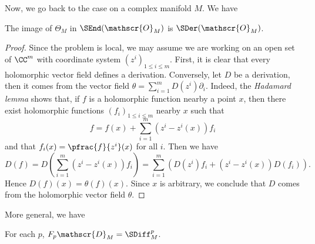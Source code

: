 Now, we go back to the case on a complex manifold $M$. We have
\begin{lem}\label{lem:Theta=Der}
The image of $\Theta_M$ in $\SEnd(\mathscr{O}_M)$ is $\SDer(\mathscr{O}_M)$.
\end{lem}
\begin{proof}
Since the problem is local, 
we may assume we are working on an open set of $\CC^m$ 
with coordinate system $(z^i)_{1\le i\le m}$. 
First, it is clear that every holomorphic vector field defines a derivation. 
Conversely, let $D$ be a derivation, then it comes from the vector field 
$\theta=\sum_{i=1}^mD(z^i)\partial_i$. 
Indeed, the \emph{Hadamard lemma} shows that, 
if $f$ is a holomorphic function nearby a point $x$, 
then there exist holomorphic functions $(f_i)_{1\le i\le m}$ nearby $x$ 
such that
\[
f=f(x)+\sum_{i=1}^m(z^i-z^i(x))f_i
\]
and that $f_i(x)=\pfrac{f}{z^i}(x)$ for all $i$. 
Then we have
\[
D(f)=D(\sum_{i=1}^m(z^i-z^i(x))f_i)
=\sum_{i=1}^m(D(z^i)f_i+(z^i-z^i(x))D(f_i)).
\]
Hence $D(f)(x)=\theta(f)(x)$. Since $x$ is arbitrary, we conclude that $D$ comes from the holomorphic vector field $\theta$.
\end{proof}
More general, we have
\begin{theorem}\label{thm:D=Diff}
For each $p$, $F_p\mathscr{D}_M=\SDiff_M^p$. 
\end{theorem}

